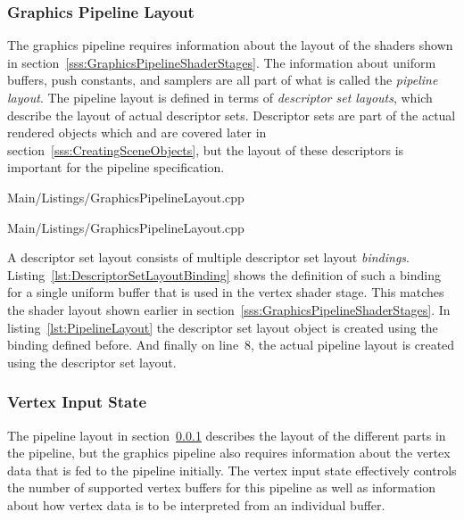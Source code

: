       \subsubsection{Graphics Pipeline Layout}
      \label{sss:GraphicsPipelineLayout}
        The graphics pipeline requires information about the layout of the shaders shown in section~\ref{sss:GraphicsPipelineShaderStages}.
        The information about uniform buffers, push constants, and samplers are all part of what is called the \textit{pipeline layout}.
        The pipeline layout is defined in terms of \textit{descriptor set layouts}, which describe the layout of actual descriptor sets.
        Descriptor sets are part of the actual rendered objects which and are covered later in section~\ref{sss:CreatingSceneObjects}, but the layout of these descriptors is important for the pipeline specification.

        
        {Main/Listings/GraphicsPipelineLayout.cpp}

        
        {Main/Listings/GraphicsPipelineLayout.cpp}

        A descriptor set layout consists of multiple descriptor set layout \textit{bindings}.
        Listing~\ref{lst:DescriptorSetLayoutBinding} shows the definition of such a binding for a single uniform buffer that is used in the vertex shader stage.
        This matches the shader layout shown earlier in section~\ref{sss:GraphicsPipelineShaderStages}.
        In listing~\ref{lst:PipelineLayout} the descriptor set layout object is created using the binding defined before.
        And finally on line~8, the actual pipeline layout is created using the descriptor set layout.

      \subsubsection{Vertex Input State}
      \label{sss:VertexInputStateSetup}
        The pipeline layout in section~\ref{sss:GraphicsPipelineLayout} describes the layout of the different parts in the pipeline, but the graphics pipeline also requires information about the vertex data that is fed to the pipeline initially.
        The vertex input state effectively controls the number of supported vertex buffers for this pipeline as well as information about how vertex data is to be interpreted from an individual buffer.

